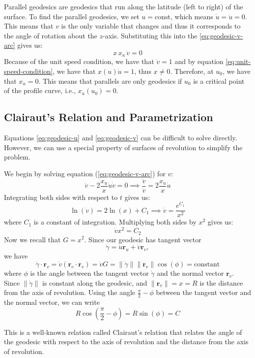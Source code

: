 \documentclass[12pt]{article}
\begin{document}
Parallel geodesics are geodesics that run along the latitude (left to right) of the surface.
To find the parallel geodesics, we set $u = \text{const}$, which means $\dot{u} = \ddot{u} = 0$.
This means that $v$ is the only variable that changes and thus it corresponds to the angle of rotation about the $z$-axis.
Substituting this into the \eqref{eq:geodesic-v-arc} gives us:
\[
	x \, x_{u} \, \ddot{v} = 0 
\]
Because of the unit speed condition, we have that \(\dot{v} = 1 \) and by equation \eqref{eq:unit-speed-condition}, we have that $x(u)\dot{u} = 1$, thus $x \neq 0$.
Therefore, at $u_0$, we have that $x_{u} = 0$. 
This means that parallels are only geodesics if $u_0$ is a critical point of the profile curve, i.e., $x_{u}(u_0) = 0$.

\subsection{Clairaut's Relation and Parametrization}

Equations \eqref{eq:geodesic-u} and \eqref{eq:geodesic-v} can be difficult to solve directly.
However, we can use a special property of surfaces of revolution to simplify the problem.

We begin by solving equation (\ref{eq:geodesic-v-arc}) for \(v\):
\[
\ddot{v} - 2\frac{x_{u}}{x}\dot{u}\dot{v} = 0 \implies \frac{\ddot{v}}{\dot{v}} = 2\frac{x_{u}}{x}\dot{u}
\]
Integrating both sides with respect to \(t\) gives us:
\[
\ln(\dot{v}) = 2\ln(x) + C_1 \implies \dot{v} = \frac{e^{C_1}}{x^2}
\]
where \(C_1\) is a constant of integration.
Multiplying both sides by \(x^2\) gives us:
\[
\dot{v} x^2 = C_2
\]
Now we recall that \(G = x^2\). 
Since our geodesic has tangent vector 
\[
\dot{\gamma} = \dot{u}\mathbf{r}_u + \dot{v}\mathbf{r}_v,
\]
we have 
\[
	\dot{\gamma} \cdot \mathbf{r}_v = \dot{v} (\mathbf{r}_v \cdot \mathbf{r}_v) = \dot{v} G = \|\dot{\gamma}\|\|\mathbf{r}_v\|\cos(\phi) = \text{constant}
\]
where \(\phi\) is the angle between the tangent vector \(\dot{\gamma}\) and the normal vector \(\mathbf{r}_v\).
Since \(\|\dot{\gamma}\|\) is constant along the geodesic, and \(\|\mathbf{r}_v\| = x = R\) is the distance from the axis of revolution.
Using the angle \(\frac{\pi}{2} - \phi\) between the tangent vector and the normal vector, we can write
\[
R\cos(\frac{\pi}{2} - \phi) = R\sin(\phi) = C
\]

This is a well-known relation called Clairaut's relation that relates the angle of the geodesic with respect to the axis of revolution and the distance from the axis of revolution.
\end{document}
